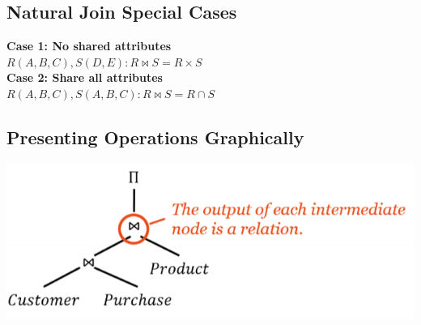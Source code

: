 \documentclass{sciposter}
\begin{document}
\begin{multicols}{3}
\begin{mdframed}
\subsection{Natural Join Special Cases}
\textbf{Case 1: No shared attributes}\\
$R(A, B, C), S(D, E): R \bowtie S = R \times S$\\
\textbf{Case 2: Share all attributes}\\
$R(A, B, C), S(A, B, C): R \bowtie S = R \cap S$
\end{mdframed}
\subsection{Presenting Operations Graphically}
\includegraphics[width=\columnwidth]{images/relational_algebra_tree.png}

\end{multicols}
\end{document}
